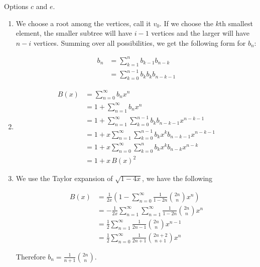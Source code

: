 \documentclass[12pt]{scrartcl}
\begin{document}
\problem{}
Options $c$ and $e$.


\problem{}
\begin{enumerate}
    \item We choose a root among the vertices, call it $v_0$. If we choose the $k$th smallest element, the smaller subtree will have $i - 1$ vertices and the larger will have $n - i$ vertices. Summing over all possibilities, we get the following form for $b_n$:

        \begin{align*}
            b_n &= \sum_{k = 1} ^n b_{k - 1} b_{n - k} \\
                &= \sum_{k = 0} ^{n - 1} b_k b_k b_{n-k-1}
        \end{align*}

    \item \begin{align*}
            B(x) &= \sum_{n = 0} ^{\infty} b_n x^n \\
                 &= 1 + \sum_{n = 1} ^{\infty} b_n x^n \\
                 &= 1 + \sum_{n = 1} ^{\infty} \sum_{k = 0} ^{n - 1} b_k b_{n - k - 1} x^{n - k - 1} \\
                 &= 1 + x\sum_{n = 1} ^{\infty} \sum_{k = 0} ^{n - 1} b_k x^k b_{n - k - 1} x^{n - k - 1} \\
                 &= 1 + x\sum_{n = 0} ^{\infty} \sum_{k = 0} ^n b_k x^k b_{n - k} x^{n - k} \\
                 &= 1 + x\,{B(x)}^2
        \end{align*}

    \item We use the Taylor expansion of $\sqrt{1 - 4x}$, we have the following

        \begin{align*}
            B(x) &= \frac{1}{2x} \left( 1 - \sum_{n = 0} ^{\infty} \frac{1}{1 - 2n} {2n \choose n} x^n \right) \\
                 &= -\frac{1}{2x} \sum _{n = 1} ^\infty \sum _{n = 1} ^\infty \frac{1}{1 - 2n} {2n \choose n} x^n \\
                 &= \frac{1}{2} \sum _{n = 1} ^\infty \frac{1}{2n - 1} {2n \choose n} x^{n - 1} \\
                 &= \frac{1}{2} \sum _{n = 0} ^\infty \frac{1}{2n + 1} {2n + 2 \choose n + 1} x^n
        \end{align*}

        Therefore $b_n = \frac{1}{n+1} \binom{2n}{n}$.


\end{enumerate}
\end{document}
